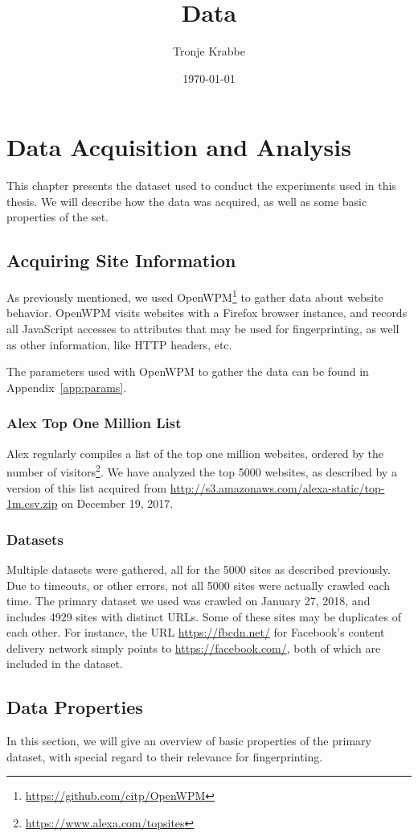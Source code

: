 \documentclass[
    fontsize=12pt,
    headings=small,
    parskip=half,
    bibliography=totoc,
    numbers=noenddot,
    open=any
]{scrreprt}
\title{Data}
\author{Tronje Krabbe}
\date{\today}
\begin{document}
\hypersetup{hidelinks}

\setcounter{tocdepth}{1}
\tableofcontents

\chapter{Data Acquisition and Analysis}
This chapter presents the dataset used to conduct the experiments used in this thesis. We will describe
how the data was acquired, as well as some basic properties of the set.

\section{Acquiring Site Information}
As previously mentioned, we used OpenWPM\footnote{\url{https://github.com/citp/OpenWPM}} to gather data about
website behavior. OpenWPM visits websites with a Firefox browser instance, and records all JavaScript accesses to
attributes that may be used for fingerprinting, as well as other information, like HTTP headers, etc.

The parameters used with OpenWPM to gather the data can be found in Appendix~\ref{app:params}.

\subsection{Alex Top One Million List}
Alex regularly compiles a list of the top one million websites, ordered by the number of
visitors\footnote{\url{https://www.alexa.com/topsites}}.
We have analyzed the top 5000 websites, as described by a version of this list acquired from
\url{http://s3.amazonaws.com/alexa-static/top-1m.csv.zip} on December 19, 2017.


\subsection{Datasets}
Multiple datasets were gathered, all for the 5000 sites as described previously. Due to timeouts, or other
errors, not all 5000 sites were actually crawled each time.
The primary dataset we used was crawled on January 27, 2018, and includes 4929 sites with distinct URLs. Some of these sites
may be duplicates of each other. For instance, the URL \url{https://fbcdn.net/} for Facebook's content delivery
network simply points to \url{https://facebook.com/}, both of which are included in the dataset.


\section{Data Properties}
In this section, we will give an overview of basic properties of the primary dataset, with special regard to
their relevance for fingerprinting.
\end{document}
